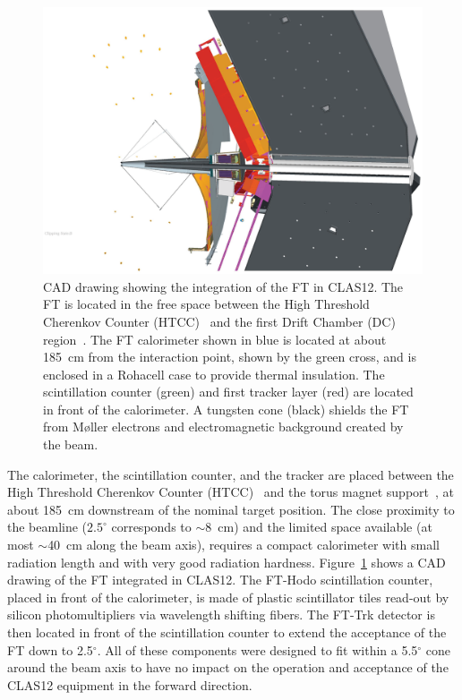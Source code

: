 \begin{figure}[th!]
\centering 
\includegraphics[width=\columnwidth]{./fig/ft_cad.eps} 
\caption{CAD drawing showing the integration of the FT in CLAS12. The FT is located in the free space between
  the High Threshold Cherenkov Counter (HTCC)~\cite{htcc} and the first Drift Chamber (DC) region~\cite{dc}.
  The FT calorimeter shown in blue is located at about 185~cm from the interaction point, shown by the green cross,
  and is enclosed in a Rohacell case to provide thermal insulation. The scintillation counter (green) and first tracker
  layer (red) are located in front of the calorimeter. A tungsten cone (black) shields the FT from M{\o}ller electrons
  and electromagnetic background created by the beam. } 
\label{fig:calinclas12} 
\end{figure}

The calorimeter, the scintillation counter, and the tracker are placed between the High Threshold Cherenkov
Counter (HTCC)~\cite{htcc} and the torus magnet support~\cite{magnets}, at about 185~cm downstream of the
nominal target position. The close proximity to the beamline ($2.5^\circ$ corresponds to $\sim$8~cm) and the
limited space available (at most $\sim$40~cm along the beam axis), requires a compact calorimeter with small
radiation length and with very good radiation hardness. Figure~\ref{fig:calinclas12} shows a CAD drawing of the
FT integrated in CLAS12. The FT-Hodo scintillation counter, placed in front of the calorimeter, is made of plastic
scintillator tiles  read-out by silicon photomultipliers via wavelength shifting fibers. The FT-Trk detector is then
located in front of the scintillation counter to extend the acceptance of the FT down to 2.5$^\circ$. All of these
components were designed to fit within a 5.5$^{\circ}$ cone around the beam axis to have no impact on the operation
and acceptance of the CLAS12 equipment in the forward direction.
